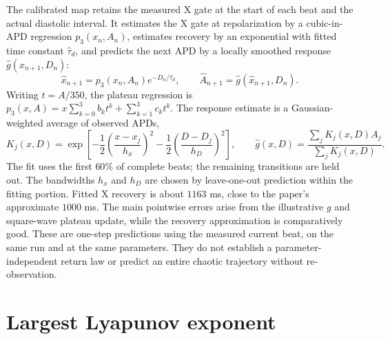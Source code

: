 \documentclass[11pt]{article}
\begin{document}
The calibrated map retains the measured X gate at the start of each beat and the actual diastolic interval. It estimates the X gate at repolarization by a cubic-in-APD regression $p_3(x_n,A_n)$, estimates recovery by an exponential with fitted time constant $\widehat\tau_d$, and predicts the next APD by a locally smoothed response $\widehat g(x_{n+1},D_n)$:
\begin{equation}
 \widehat x_{n+1}=p_3(x_n,A_n)e^{-D_n/\widehat\tau_d},
 \qquad \widehat A_{n+1}=\widehat g(\widehat x_{n+1},D_n).
\end{equation}
Writing $t=A/350$, the plateau regression is $p_3(x,A)=x\sum_{k=0}^{3}b_k t^k+\sum_{k=1}^{3}c_k t^k$. The response estimate is a Gaussian-weighted average of observed APDs,
\begin{equation}
 K_j(x,D)=\exp\!\left[-\frac12\left(\frac{x-x_j}{h_x}\right)^2
                         -\frac12\left(\frac{D-D_j}{h_D}\right)^2\right],
 \qquad \widehat g(x,D)=\frac{\sum_j K_j(x,D)A_j}{\sum_j K_j(x,D)}.
\end{equation}
The fit uses the first $60\%$ of complete beats; the remaining transitions are held out. The bandwidths $h_x$ and $h_D$ are chosen by leave-one-out prediction within the fitting portion. Fitted X recovery is about $1163$ ms, close to the paper's approximate $1000$ ms. The main pointwise errors arise from the illustrative $g$ and square-wave plateau update, while the recovery approximation is comparatively good. These are one-step predictions using the measured current beat, on the same run and at the same parameters. They do not establish a parameter-independent return law or predict an entire chaotic trajectory without re-observation.

\section{Largest Lyapunov exponent}
\end{document}
